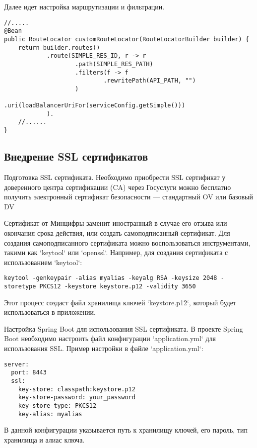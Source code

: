 Далее идет настройка маршрутизации и фильтрации.

\begin{lstlisting}
//.....
@Bean
public RouteLocator customRouteLocator(RouteLocatorBuilder builder) {
    return builder.routes()
            .route(SIMPLE_RES_ID, r -> r
                    .path(SIMPLE_RES_PATH)
                    .filters(f -> f
                            .rewritePath(API_PATH, "")
                    )
                    .uri(loadBalancerUriFor(serviceConfig.getSimple()))
            ).
    //......
}
\end{lstlisting}

\subsection{Внедрение SSL сертификатов}

Подготовка SSL сертификата.
Необходимо приобрести SSL сертификат у доверенного центра сертификации (CA) через Госуслуги можно бесплатно получить электронный сертификат безопасности — стандартный OV или базовый DV

Сертификат от Минцифры заменит иностранный в случае его отзыва или окончания срока действия, или создать самоподписанный сертификат.
Для создания самоподписанного сертификата можно воспользоваться инструментами, такими как `keytool` или `openssl`.
Например, для создания сертификата с использованием `keytool`:

\begin{verbatim}
keytool -genkeypair -alias myalias -keyalg RSA -keysize 2048 -storetype PKCS12 -keystore keystore.p12 -validity 3650
\end{verbatim}

Этот процесс создаст файл хранилища ключей `keystore.p12`, который будет использоваться в приложении.

Настройка Spring Boot для использования SSL сертификата.
В проекте Spring Boot необходимо настроить файл конфигурации `application.yml` для использования SSL. Пример настройки в файле `application.yml`:

\begin{lstlisting}
server:
  port: 8443
  ssl:
    key-store: classpath:keystore.p12
    key-store-password: your_password
    key-store-type: PKCS12
    key-alias: myalias
\end{lstlisting}

В данной конфигурации указывается путь к хранилищу ключей, его пароль, тип хранилища и алиас ключа.

